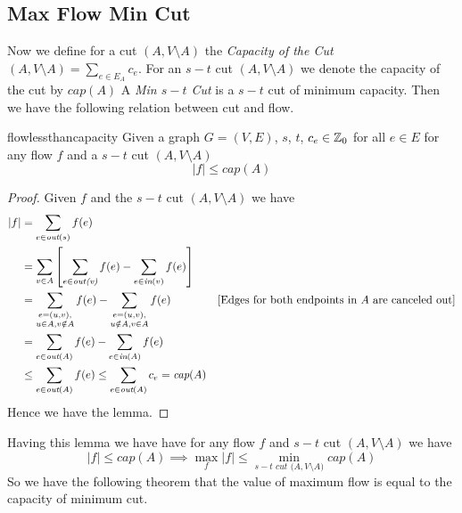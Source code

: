 \subsection{Max Flow Min Cut}
Now we define for a cut $(A,V\setminus A)$ the \textit{Capacity of the Cut} $(A,V\setminus A)=\sum\limits_{e\in E_A}c_e$. For an $s-t$ cut $(A,V\setminus A)$ we denote the capacity of the cut by $\textit{cap}(A)$ A \textit{Min $s-t$ Cut} is a $s-t$ cut of minimum capacity. Then we have the following relation between cut and flow.
\begin{lemma}{}{flowlessthancapacity}
	Given a graph $G=(V,E)$, $s$, $t$, $c_e\in\mathbb{Z}_0$ for all $e\in E$ for any flow $f$ and a $s-t$ cut $(A,V\setminus A)$ $$|f|\leq \textit{cap}(A)$$
\end{lemma}
\begin{proof}
	Given $f$ and the $s-t$ cut $(A,V\setminus A)$ we have \begin{align*}
		|f| & = \sum_{e\in\textit{out$(s)$}}f(e)                                                          \\
		    & = \sum_{v\in A}\left[ \sum_{e\in\textit{out(v)}}f(e)-\sum_{e\in \textit{in$(v)$}}f(e)  \right]   \\
		    & = \sum_{\substack{e=(u,v),                                                                  \\ u\in A,v\notin A}}f(e) -\sum_{\substack{e=(u,v),\\ u\notin A,v\in A}}f(e) & [\text{Edges for both endpoints in $A$ are canceled out}]\\
		    & =\sum_{e\in \textit{out$(A)$}}f(e)-\sum_{e\in \textit{in}(A)}f(e)                           \\
		    & \leq \sum_{e\in \textit{out$(A)$}}f(e)\leq \sum_{e\in \textit{out$(A)$}}c_e=\textit{cap}(A)
	\end{align*}
	Hence we have the lemma.
\end{proof}
Having this lemma we have have for any flow $f$ and $s-t$ cut $(A,V\setminus A)$ we have $$|f|\leq \textit{cap$(A)$}\implies \max\limits_f|f|\leq\min\limits_{s-t\textit{ cut $(A,V\setminus A$)}}\textit{cap$(A)$}$$So we have the following theorem that the value of maximum flow is equal to the capacity of minimum cut.
